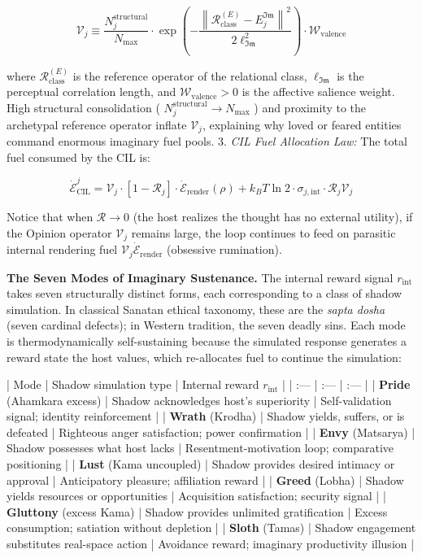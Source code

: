 \documentclass[11pt,a4paper]{article}
\theoremstyle{definition}
\theoremstyle{remark}
\begin{document}
\begin{equation}
\boxed{\mathcal{V}_j \equiv \frac{N_j^{\text{structural}}}{N_{\max}} \cdot \exp\left(-\frac{\left\|\mathcal{R}_{\text{class}}^{(E)} - E_j^{\mathfrak{Im}}\right\|^2}{2\ell_{\mathfrak{Im}}^2}\right) \cdot \mathcal{W}_{\text{valence}}}
\end{equation}


where $\mathcal{R}_{\text{class}}^{(E)}$ is the reference operator of the relational class, $\ell_{\mathfrak{Im}}$ is the perceptual correlation length, and $\mathcal{W}_{\text{valence}} > 0$ is the affective salience weight. High structural consolidation ( $N_j^{\text{structural}} \to N_{\max}$ ) and proximity to the archetypal reference operator inflate $\mathcal{V}_j$, explaining why loved or feared entities command enormous imaginary fuel pools.
3. \textit{CIL Fuel Allocation Law:} The total fuel consumed by the CIL is:


\begin{equation}
\boxed{\dot{\mathcal{E}}_{\text{CIL}}^j = \mathcal{V}_j \cdot \left[1 - \mathcal{R}_j\right] \cdot \dot{\mathcal{E}}_{\text{render}}(\rho) + k_B T \ln 2 \cdot \sigma_{j,\text{int}} \cdot \mathcal{R}_j \mathcal{V}_j}
\end{equation}


Notice that when $\mathcal{R} \to 0$ (the host realizes the thought has no external utility), if the Opinion operator $\mathcal{V}_j$ remains large, the loop continues to feed on parasitic internal rendering fuel $\mathcal{V}_j \dot{\mathcal{E}}_{\text{render}}$ (obsessive rumination).

\textbf{The Seven Modes of Imaginary Sustenance.} The internal reward signal $r_{\text{int}}$ takes seven structurally distinct forms, each corresponding to a class of shadow simulation. In classical Sanatan ethical taxonomy, these are the \textit{sapta dosha} (seven cardinal defects); in Western tradition, the seven deadly sins. Each mode is thermodynamically self-sustaining because the simulated response generates a reward state the host values, which re-allocates fuel to continue the simulation:

| Mode | Shadow simulation type | Internal reward $r_{\text{int}}$ |
| :--- | :--- | :--- |
| \textbf{Pride} (Ahamkara excess) | Shadow acknowledges host's superiority | Self-validation signal; identity reinforcement |
| \textbf{Wrath} (Krodha) | Shadow yields, suffers, or is defeated | Righteous anger satisfaction; power confirmation |
| \textbf{Envy} (Matsarya) | Shadow possesses what host lacks | Resentment-motivation loop; comparative positioning |
| \textbf{Lust} (Kama uncoupled) | Shadow provides desired intimacy or approval | Anticipatory pleasure; affiliation reward |
| \textbf{Greed} (Lobha) | Shadow yields resources or opportunities | Acquisition satisfaction; security signal |
| \textbf{Gluttony} (excess Kama) | Shadow provides unlimited gratification | Excess consumption; satiation without depletion |
| \textbf{Sloth} (Tamas) | Shadow engagement substitutes real-space action | Avoidance reward; imaginary productivity illusion |
\end{document}
